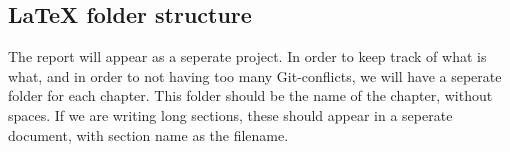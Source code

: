 \subsection{LaTeX folder structure}
\label{sec:latexfolderstructure}
The report will appear as a seperate project. In order to keep track of what is what, and in order to not having too many Git-conflicts, 
we will have a seperate folder for each chapter. This folder should be the name of the chapter, without spaces. 
If we are writing long sections, these should appear in a seperate document, with section name as the 
filename.  


